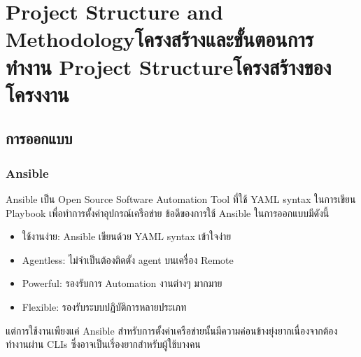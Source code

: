 \chapter{\ifproject%
\ifenglish Project Structure and Methodology\else โครงสร้างและขั้นตอนการทำงาน\fi
\else%
\ifenglish Project Structure\else โครงสร้างของโครงงาน\fi
\fi
}

\makeatletter


\makeatother

\section{การออกแบบ}

\subsection{Ansible}
\hspace{0.5in} Ansible เป็น Open Source Software Automation Tool ที่ใช้ YAML syntax ในการเขียน Playbook เพื่อทำการตั้งค่าอุปกรณ์เครือข่าย ข้อดีของการใช้ Ansible ในการออกแบบมีดังนี้ 
\begin{itemize}
  \item ใช้งานง่าย: Ansible เขียนด้วย YAML syntax เข้าใจง่าย
  \item Agentless: ไม่จำเป็นต้องติดตั้ง agent บนเครื่อง Remote
  \item Powerful: รองรับการ Automation งานต่างๆ มากมาย
  \item Flexible: รองรับระบบปฏิบัติการหลายประเภท
\end{itemize}
\hspace{0.5in} แต่การใช้งานเพียงแค่ Ansible สำหรับการตั้งค่าเครือข่ายนั้นมีความค่อนข้างยุ่งยากเนื่องจากต้องทำงานผ่าน CLIs ซึ่งอาจเป็นเรื่องยากสำหรับผู้ใช้บางคน

